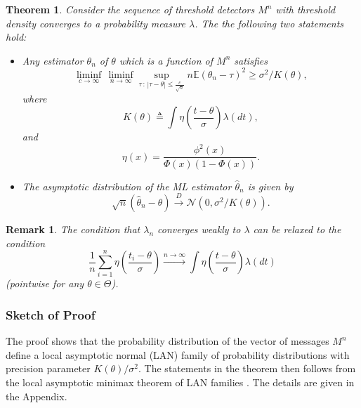 \documentclass[letterpaper, conference]{IEEEtran}      %
\newtheorem{thm}{\bf{Theorem}}
\newtheorem{rem}{\bf {Remark}}
\begin{document}
\begin{thm} \label{thm:LAN}
Consider the sequence of threshold detectors $M^n$ with threshold density converges to a probability measure $\lambda$. The the following two statements hold:
\begin{itemize}
\item[(i)] Any estimator ${\theta}_n$ of $\theta$ which is a function of $M^n$ satisfies
\[
\liminf_{c\rightarrow \infty}\, \liminf_{n\rightarrow \infty} \sup_{\tau\,:\,| \tau - \theta| \leq \frac{c}{\sqrt{n}} }  n \mathbb E \left({\theta}_n - \tau \right)^2 \geq \sigma^2/K(\theta),
\]
where 
\[
K(\theta) \triangleq \int \eta\left(\frac{t-\theta}{\sigma} \right) \lambda(dt),
\]
and 
\[
 \eta(x) = \frac{ \phi^2\left( x \right)}{ \Phi\left( x \right) \left(1-\Phi\left(x\right) \right)}. 
\]
\item[(ii)] The asymptotic distribution of the ML estimator $\widehat{\theta}_n$ is given by
\[
\sqrt{n}(\widehat{\theta}_n - \theta) \overset{D}{\rightarrow} \mathcal N\left(0,\sigma^2/K(\theta) \right).
\]
\end{itemize}
\end{thm}

\begin{rem}
The condition that $\lambda_n$ converges weakly to $\lambda$ can be relaxed to the condition
\[
\frac{1}{n} \sum_{i=1}^n  \eta \left( \frac{t_i-\theta}{\sigma} \right)  \overset{n \rightarrow \infty}\longrightarrow \int \eta \left( \frac{t-\theta}{\sigma} \right) \lambda(dt)
\]
(pointwise for any $\theta \in \Theta$). 
\end{rem}


\subsubsection*{Sketch of Proof}
The proof shows that the probability distribution of the vector of messages $M^n$ define a local asymptotic normal (LAN) family of probability distributions with precision parameter $K(\theta)/\sigma^2$. The statements in the theorem then follows from the local asymptotic minimax theorem of LAN families \cite{van2000asymptotic}. The details are given in the Appendix.\\


\end{document}
